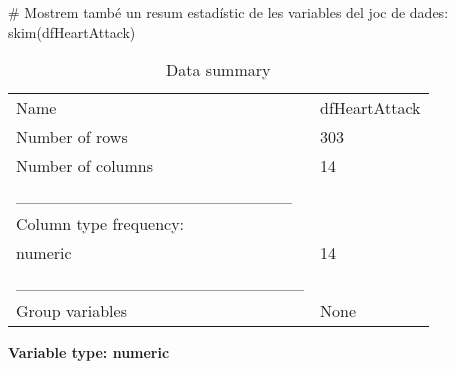 \documentclass[
]{article}
\newenvironment{Shaded}{\begin{snugshade}}{\end{snugshade}}
\newcommand{\CommentTok}[1]{\textcolor[rgb]{0.50,0.62,0.50}{#1}}
\newcommand{\FunctionTok}[1]{\textcolor[rgb]{0.94,0.94,0.56}{#1}}
\newcommand{\NormalTok}[1]{\textcolor[rgb]{0.80,0.80,0.80}{#1}}
\begin{document}
\begin{Shaded}
\begin{Highlighting}[]
\CommentTok{\# Mostrem també un resum estadístic de les variables del joc de dades:}
\FunctionTok{skim}\NormalTok{(dfHeartAttack)}
\end{Highlighting}
\end{Shaded}

\begin{longtable}[]{@{}ll@{}}
\caption{Data summary}\tabularnewline
\toprule\noalign{}
\endfirsthead
\endhead
\bottomrule\noalign{}
\endlastfoot
Name & dfHeartAttack \\
Number of rows & 303 \\
Number of columns & 14 \\
\_\_\_\_\_\_\_\_\_\_\_\_\_\_\_\_\_\_\_\_\_\_\_ & \\
Column type frequency: & \\
numeric & 14 \\
\_\_\_\_\_\_\_\_\_\_\_\_\_\_\_\_\_\_\_\_\_\_\_\_ & \\
Group variables & None \\
\end{longtable}

\textbf{Variable type: numeric}
\end{document}
